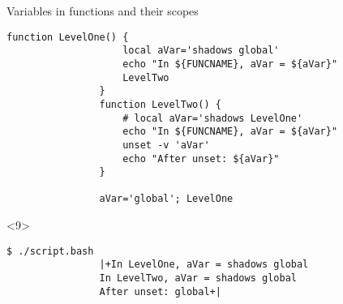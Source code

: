 \begin{frame}[fragile]{Variables in functions and their scopes}
\begin{overlayarea}{\textwidth}{0.7\textheight}
\begin{onlyenv}
\begin{lstlisting}[style=MyBash, aboveskip=2mm]
                function LevelOne() {
                    local aVar='shadows global'
                    echo "In ${FUNCNAME}, aVar = ${aVar}"
                    LevelTwo
                }
                function LevelTwo() {
                    # local aVar='shadows LevelOne'
                    echo "In ${FUNCNAME}, aVar = ${aVar}"
                    unset -v 'aVar'
                    echo "After unset: ${aVar}"
                }

                aVar='global'; LevelOne
            \end{lstlisting}
        \end{onlyenv}
        \begin{onlyenv}<9>
            \begin{lstlisting}[style=MyBash, aboveskip=4pt, numbers=none]
                $ ./script.bash
                |+In LevelOne, aVar = shadows global
                In LevelTwo, aVar = shadows global
                After unset: global+|
            \end{lstlisting}
            \begin{center}
            \end{center}
        \end{onlyenv}
    \end{overlayarea}
\end{frame}
